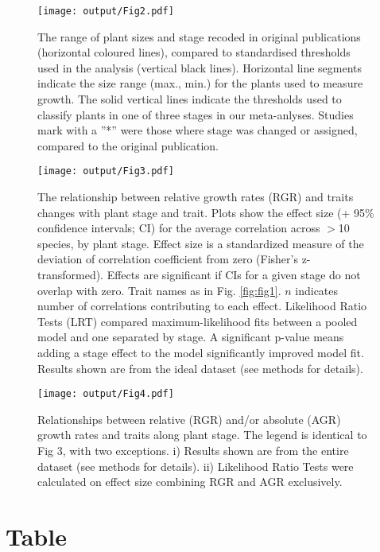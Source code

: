 \documentclass[a4paper,11pt]{article}
\begin{document}
\begin{figure}[h!]
\centering
\texttt{[image: output/Fig2.pdf]}
\caption{The range of plant sizes and stage recoded in original publications (horizontal coloured lines), compared to standardised thresholds used in the analysis (vertical black lines). Horizontal line segments indicate the size range (max., min.) for the plants used to measure growth. The solid vertical lines indicate the thresholds used to classify plants in one of three stages in our meta-anlyses. Studies mark with a ''*'' were those where stage was changed or assigned, compared to the original publication. }
\label{fig:fig2}
\end{figure}



\begin{figure}[h!]
\centering
\texttt{[image: output/Fig3.pdf]}
\caption{The relationship between relative growth rates (RGR) and traits changes with plant stage and trait. Plots show the effect size (+ 95\% confidence intervals; CI) for the average correlation across $>$10 species, by plant stage. Effect size is a standardized measure of the deviation of correlation coefficient from zero (Fisher's z-transformed). Effects are significant if CIs for a given stage do not overlap with zero. Trait names as in Fig. \ref{fig:fig1}. $n$ indicates number of correlations contributing to each effect. Likelihood Ratio Tests (LRT) compared maximum-likelihood fits between a pooled model and one separated by stage. A significant p-value means adding a stage effect to the model significantly improved model fit. Results shown are from the ideal dataset (see methods for details).}
\label{fig:fig3}
\end{figure}


\begin{figure}[h!]
\centering
\texttt{[image: output/Fig4.pdf]}
\caption{Relationships between relative (RGR) and/or absolute (AGR) growth rates and traits along plant stage. The legend is identical to Fig 3, with two exceptions. i) Results shown are from the entire dataset (see methods for details). ii) Likelihood Ratio Tests were calculated on effect size combining RGR and AGR exclusively.}
\label{fig:fig4}
\end{figure}




\clearpage
\section*{Table}
\setcounter{table}{0}
\end{document}
